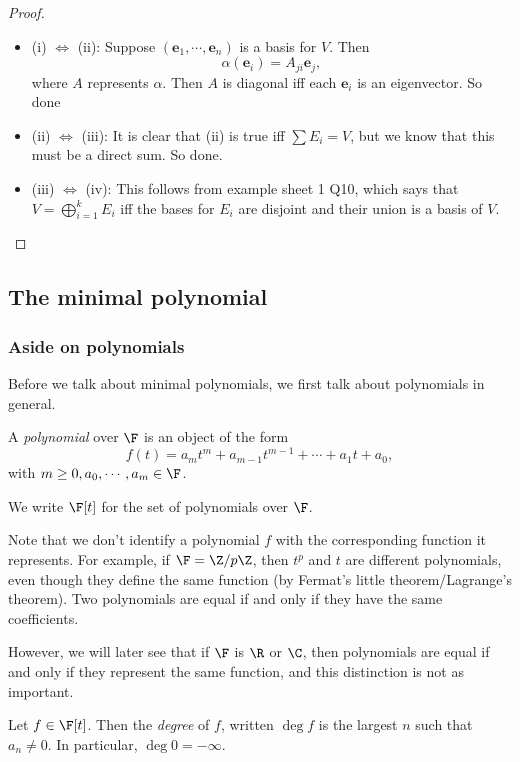 \documentclass[a4paper]{article}
\begin{document}
\begin{proof}\leavevmode
  \begin{itemize}
    \item (i) $\Leftrightarrow$ (ii): Suppose $(\mathbf{e}_1, \cdots, \mathbf{e}_n)$ is a basis for $V$. Then
      \[
        \alpha(\mathbf{e}_i) = A_{ji} \mathbf{e}_j,
      \]
      where $A$ represents $\alpha$. Then $A$ is diagonal iff each $\mathbf{e}_i$ is an eigenvector. So done
    \item (ii) $\Leftrightarrow$ (iii): It is clear that (ii) is true iff $\sum E_i = V$, but we know that this must be a direct sum. So done.
    \item (iii) $\Leftrightarrow$ (iv): This follows from example sheet 1 Q10, which says that $V = \bigoplus_{i = 1}^k E_i$ iff the bases for $E_i$ are disjoint and their union is a basis of $V$.\qedhere
  \end{itemize}
\end{proof}
\subsection{The minimal polynomial}
\subsubsection{Aside on polynomials}
Before we talk about minimal polynomials, we first talk about polynomials in general.

\begin{defi}[Polynomial]
  A \emph{polynomial} over $\F$ is an object of the form
  \[
    f(t) = a_m t^m + a_{m - 1}t^{m - 1} + \cdots + a_1 t + a_0,
  \]
  with $m \geq 0, a_0, \cdots, a_m \in \F$.

  We write $\F[t]$ for the set of polynomials over $\F$.
\end{defi}
Note that we don't identify a polynomial $f$ with the corresponding function it represents. For example, if $\F = \Z/p\Z$, then $t^p$ and $t$ are different polynomials, even though they define the same function (by Fermat's little theorem/Lagrange's theorem). Two polynomials are equal if and only if they have the same coefficients.

However, we will later see that if $\F$ is $\R$ or $\C$, then polynomials are equal if and only if they represent the same function, and this distinction is not as important.

\begin{defi}[Degree]
  Let $f \in \F[t]$. Then the \emph{degree} of $f$, written $\deg f$ is the largest $n$ such that $a_n \not= 0$. In particular, $\deg 0 = -\infty$.
\end{defi}
\end{document}
